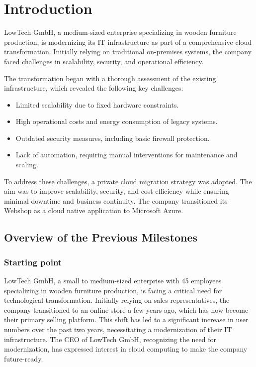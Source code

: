 \documentclass{llncs}
\begin{document}
\section{Introduction}

LowTech GmbH, a medium-sized enterprise specializing in wooden furniture production, is modernizing its IT infrastructure as part of a comprehensive cloud transformation. Initially relying on traditional on-premises systems, the company faced challenges in scalability, security, and operational efficiency.

The transformation began with a thorough assessment of the existing infrastructure, which revealed the following key challenges:
\begin{itemize}
    \item Limited scalability due to fixed hardware constraints.
    \item High operational costs and energy consumption of legacy systems.
    \item Outdated security measures, including basic firewall protection.
    \item Lack of automation, requiring manual interventions for maintenance and scaling.
\end{itemize}

To address these challenges, a private cloud migration strategy was adopted. The aim was to improve scalability, security, and cost-efficiency while ensuring minimal downtime and business continuity.
The company transitioned its Webshop as a cloud native application to Microsoft Azure. 

\subsection{Overview of the Previous Milestones}

\subsubsection{Starting point}
LowTech GmbH, a small to medium-sized enterprise with 45 employees specializing in wooden furniture production, is facing a critical need for technological transformation.
Initially relying on sales representatives, the company transitioned to an online store a few years ago, which has now become their primary selling platform.
This shift has led to a significant increase in user numbers over the past two years, necessitating a modernization of their IT infrastructure.
The CEO of LowTech GmbH, recognizing the need for modernization, has expressed interest in cloud computing to make the company future-ready.
\end{document}
